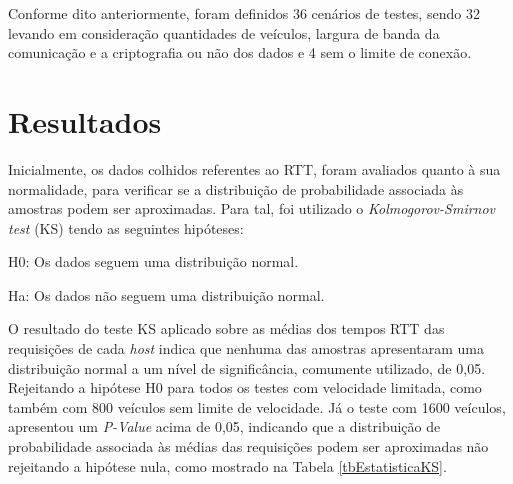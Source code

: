 \documentclass[
	12pt,				%
	oneside,			%
	a4paper,			%
	english,			%
	brazil				%
	]{abntex2ppgsi}
\begin{document}
Conforme dito anteriormente, foram definidos 36 cenários de testes, sendo 32 levando em consideração quantidades de veículos, largura de banda da comunicação e a criptografia ou não dos dados e 4 sem o limite de conexão.


\section{Resultados}

Inicialmente, os dados colhidos referentes ao RTT, foram avaliados quanto à sua normalidade, para verificar se a distribuição de probabilidade associada às amostras podem ser aproximadas. Para tal, foi utilizado o \textit{Kolmogorov-Smirnov test} (KS) tendo as seguintes hipóteses:

H0: Os dados seguem uma distribuição normal.

Ha: Os dados não seguem uma distribuição normal.

O resultado do teste KS aplicado sobre as médias dos tempos RTT das requisições de cada \textit{host} indica que nenhuma das amostras apresentaram uma distribuição normal a um nível de significância, comumente utilizado, de 0,05. Rejeitando a hipótese H0 para todos os testes com velocidade limitada, como também com 800 veículos sem limite de velocidade. Já o teste com 1600 veículos, apresentou um \textit{P-Value} acima de 0,05, indicando que a distribuição de probabilidade associada às médias das requisições podem ser aproximadas não rejeitando a hipótese nula, como mostrado na Tabela \ref{tbEstatisticaKS}.
\end{document}
